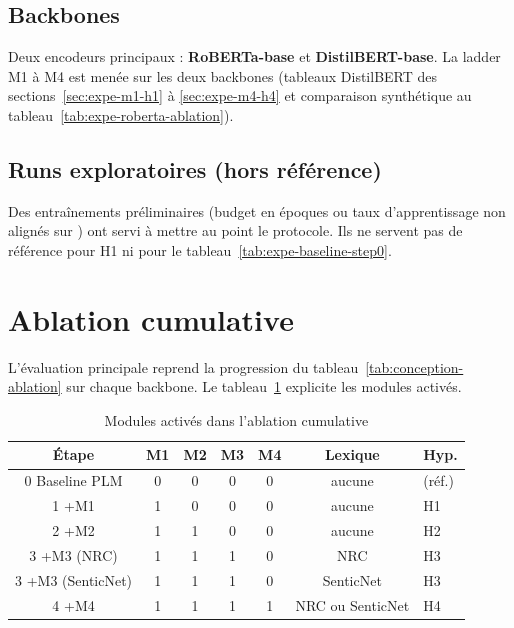 \subsection{Backbones}

Deux encodeurs principaux : \textbf{RoBERTa-base} et
\textbf{DistilBERT-base}. La ladder M1 à M4 est menée sur les deux
backbones (tableaux DistilBERT des sections~\ref{sec:expe-m1-h1} à
\ref{sec:expe-m4-h4} et comparaison synthétique au
tableau~\ref{tab:expe-roberta-ablation}).

\subsection{Runs exploratoires (hors référence)}
\label{sec:expe-baseline-pilot}

Des entraînements préliminaires (budget en époques ou taux d'apprentissage
non alignés sur \cite{demszky2020}) ont servi à mettre au point le
protocole. Ils ne servent pas de référence pour H1 ni pour le
tableau~\ref{tab:expe-baseline-step0}.

\section{Ablation cumulative}
\label{sec:expe-ablation}

L'évaluation principale reprend la progression du
tableau~\ref{tab:conception-ablation} sur chaque backbone. Le
tableau~\ref{tab:expe-ablation-flags} explicite les modules activés.

\begin{table}[H]
\centering
\caption{Modules activés dans l'ablation cumulative}
\label{tab:expe-ablation-flags}
\renewcommand{\arraystretch}{1.25}
\begin{tabular}{|c|c|c|c|c|c|p{3.6cm}|}
\hline
\textbf{Étape} & \textbf{M1} & \textbf{M2} & \textbf{M3} & \textbf{M4} & \textbf{Lexique} & \textbf{Hyp.} \\
\hline
0 Baseline PLM & 0 & 0 & 0 & 0 & aucune & (réf.) \\
\hline
1 +M1 & 1 & 0 & 0 & 0 & aucune & H1 \\
\hline
2 +M2 & 1 & 1 & 0 & 0 & aucune & H2 \\
\hline
3 +M3 (NRC) & 1 & 1 & 1 & 0 & NRC & H3 \\
\hline
3 +M3 (SenticNet) & 1 & 1 & 1 & 0 & SenticNet & H3 \\
\hline
4 +M4 & 1 & 1 & 1 & 1 & NRC ou SenticNet & H4 \\
\hline
\end{tabular}
\end{table}

